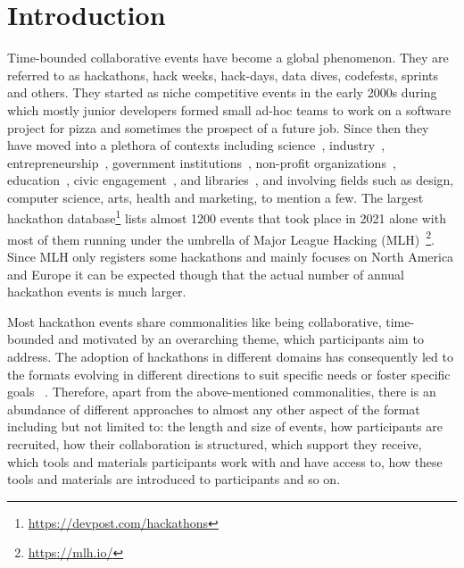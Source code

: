\documentclass{ieeeaccess}
\begin{document}
\section{Introduction}

\label{sec:introduction}
Time-bounded collaborative events have become a global phenomenon. 
They are referred to as hackathons, hack weeks, hack-days, data dives, codefests, sprints and others.
They started as niche competitive events in the early 2000s during which mostly junior developers formed small ad-hoc teams to work on a software project for pizza and sometimes the prospect of a future job. 
Since then they have moved into a plethora of contexts including science~\cite{huppenkothen2018hack}, industry~\cite{lewis2015ux},  entrepreneurship~\cite{cobham2017appfest}, government institutions~\cite{briscoe2014digital}, non-profit organizations~\cite{trinaistic2020hackathons}, education~\cite{wang2018extended}, civic engagement~\cite{taylor2018everybody}, and libraries~\cite{longmeier2021hackathons}, and involving fields such as design, computer science, arts, health and marketing, to mention a few. 
The largest hackathon database\footnote{\href{https://devpost.com/hackathons}{https://devpost.com/hackathons}} lists almost 1200 events that took place in 2021 alone with most of them running under the umbrella of Major League Hacking (MLH)~\footnote{\href{https://mlh.io/}{https://mlh.io/}}. 
Since MLH only registers some hackathons and mainly focuses on North America and Europe it can be expected though that the actual number of annual hackathon events is much larger.

Most hackathon events share commonalities like being collaborative, time-bounded and motivated by an overarching theme, which participants aim to address.
The adoption of hackathons in different domains has consequently led to the formats evolving in different directions to suit specific needs or foster specific goals ~\cite{falk2021hackathons}.
Therefore, apart from the above-mentioned commonalities, there is an abundance of different approaches to almost any other aspect of the format including but not limited to: the length and size of events, how participants are recruited, how their collaboration is structured, which support they receive, which tools and materials participants work with and have access to, how these tools and materials are introduced to participants and so on. 
\end{document}
